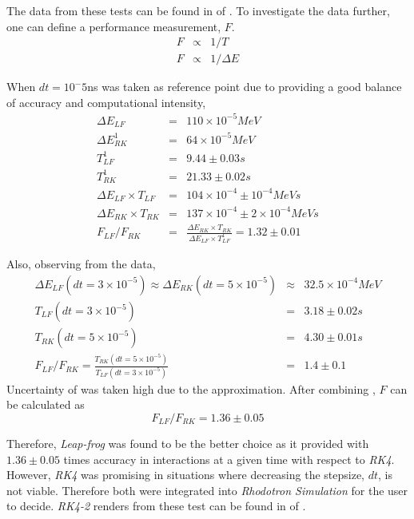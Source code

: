 \documentclass[a4paper,oneside,12pt]{report}
\numberwithin{equation}{chapter}
\begin{document}
The data from these tests can be found in  of .
To investigate the data further, one can define a performance measurement, $F$.
\begin{eqnarray*}
    F &\propto& 1/T \\
    F &\propto& 1/\Delta E 
\end{eqnarray*}

When $dt=10^-5$ns was taken as reference point due to providing a good balance of accuracy and computational intensity,
\begin{eqnarray} \label{eq:f_lf_rk_mag_1}
    \Delta E_{LF} &=& 110 \times 10^{-5} MeV \nonumber\\
    \Delta E_{RK}^1 &=& 64 \times 10^{-5} MeV \nonumber\\
    T_{LF}^1 &=& 9.44 \pm 0.03 s \nonumber\\
    T_{RK}^1 &=& 21.33 \pm 0.02 s \nonumber\\
    \Delta E_{LF} \times T_{LF} &=& 104 \times 10^{-4} \pm 10^{-4} MeV s \nonumber\\ %
    \Delta E_{RK} \times T_{RK} &=& 137 \times 10^{-4} \pm 2\times 10^{-4}  MeV s \nonumber\\ %
    F_{LF}/F_{RK} &=& \frac{\Delta E_{RK} \times T_{RK} }{\Delta E_{LF} \times T_{LF}^1} = 1.32 \pm 0.01
\end{eqnarray}

Also, observing from the data,
\begin{eqnarray} \label{eq:f_lf_rk_mag_2}
    \Delta E_{LF} (dt=3 \times 10^{-5}) \approx \Delta E_{RK} (dt=5 \times 10^{-5}) &\approx& 32.5 \times 10^{-4} MeV \nonumber\\
    T_{LF}(dt=3 \times 10^{-5})  &=& 3.18 \pm 0.02 s \nonumber\\ %
    T_{RK}(dt=5 \times 10^{-5})  &=& 4.30 \pm 0.01 s \nonumber\\ %
    F_{LF}/F_{RK} = \frac{T_{RK}(dt=5 \times 10^{-5})}{T_{LF}(dt=3 \times 10^{-5})} &=& 1.4 \pm 0.1
\end{eqnarray}
Uncertainty of  was taken high due to the approximation. After combining , $F$ can be calculated as
\begin{equation}
    F_{LF}/F_{RK} = 1.36 \pm 0.05
\end{equation}

Therefore, \textit{Leap-frog} was found to be the better choice as it provided with $1.36 \pm 0.05$ times accuracy in \eB interactions at a given time with respect to \textit{RK4}. However,
\textit{RK4} was promising in situations where decreasing the stepsize, $dt$, is not viable. Therefore both were integrated into \textit{Rhodotron Simulation} for the user to decide.
\textit{RK4-2} renders from these test can be found in  of .
\end{document}
